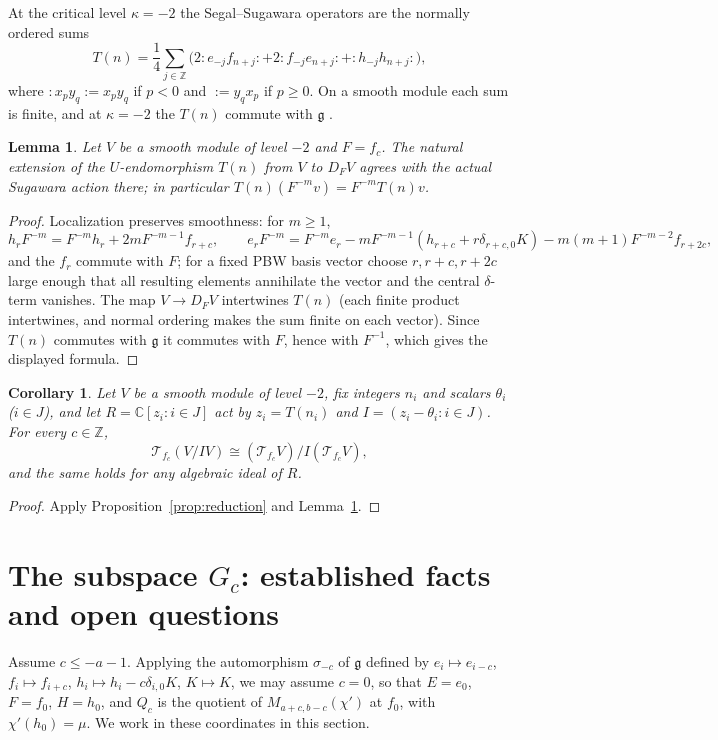 \documentclass[11pt,a4paper]{article}
\newcommand{\C}{\mathbb C}
\newcommand{\Z}{\mathbb Z}
\newcommand{\g}{\mathfrak g}
\newcommand{\T}{\mathcal T}
\newtheorem{lemma}[theorem]{Lemma}
\newtheorem{corollary}[theorem]{Corollary}
\begin{document}
At the critical level $\kappa=-2$ the Segal--Sugawara operators are the
normally ordered sums
\begin{equation}\label{eq:sugawara}
 T(n)=\frac14\sum_{j\in\Z}
 \bigl(2:e_{-j}f_{n+j}:+2:f_{-j}e_{n+j}:+:h_{-j}h_{n+j}:\bigr),
\end{equation}
where $:x_py_q:=x_py_q$ if $p<0$ and $:=y_qx_p$ if $p\ge0$. On a smooth
module each sum is finite, and at $\kappa=-2$ the $T(n)$ commute with
$\g$ \cite[Section 2.5]{FGXZ}.
\begin{lemma}\label{lem:sugawara}
Let $V$ be a smooth module of level $-2$ and $F=f_c$. The natural extension
of the $U$-endomorphism $T(n)$ from $V$ to $D_FV$ agrees with the actual
Sugawara action there; in particular $T(n)(F^{-m}v)=F^{-m}T(n)v$.
\end{lemma}
\begin{proof}
Localization preserves smoothness: for $m\ge1$,
\[
 h_rF^{-m}=F^{-m}h_r+2mF^{-m-1}f_{r+c},\qquad
 e_rF^{-m}=F^{-m}e_r-mF^{-m-1}(h_{r+c}+r\delta_{r+c,0}K)
 -m(m+1)F^{-m-2}f_{r+2c},
\]
and the $f_r$ commute with $F$; for a fixed PBW basis vector choose
$r,r+c,r+2c$ large enough that all resulting elements annihilate the
vector and the central $\delta$-term vanishes. The map $V\to D_FV$
intertwines $T(n)$ (each finite product intertwines, and normal ordering
makes the sum finite on each vector). Since $T(n)$ commutes with $\g$ it
commutes with $F$, hence with $F^{-1}$, which gives the displayed formula.
\end{proof}
\begin{corollary}
\label{cor:critical}
Let $V$ be a smooth module of level $-2$, fix integers $n_i$ and scalars
$\theta_i$ ($i\in J$), and let $R=\C[z_i:i\in J]$ act by $z_i=T(n_i)$ and
$I=(z_i-\theta_i:i\in J)$. For every $c\in\Z$,
\[
 \T_{f_c}(V/IV)\cong(\T_{f_c}V)/I(\T_{f_c}V),
\]
and the same holds for any algebraic ideal of $R$.
\end{corollary}
\begin{proof}
Apply Proposition~\ref{prop:reduction} and Lemma~\ref{lem:sugawara}.
\end{proof}

\section{The subspace \texorpdfstring{$G_c$}{Gc}: established facts and open questions}
\label{sec:Gc}

Assume $c\le-a-1$. Applying the automorphism $\sigma_{-c}$ of $\g$ defined
by $e_i\mapsto e_{i-c}$, $f_i\mapsto f_{i+c}$,
$h_i\mapsto h_i-c\delta_{i,0}K$, $K\mapsto K$, we may assume $c=0$, so
that $E=e_0$, $F=f_0$, $H=h_0$, and $Q_c$ is the quotient of
$M_{a+c,b-c}(\chi')$ at $f_0$, with $\chi'(h_0)=\mu$. We work in these
coordinates in this section.
\end{document}

